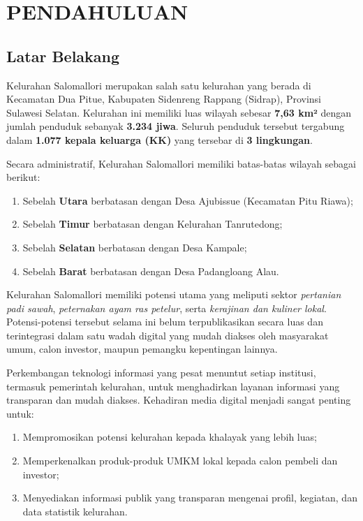 \documentclass[12pt,a4paper]{report}
\begin{document}
\tableofcontents
\clearpage

\listoffigures
\clearpage

\listoftables
\clearpage

\chapter{PENDAHULUAN}

\section{Latar Belakang}

Kelurahan Salomallori merupakan salah satu kelurahan yang berada di Kecamatan Dua Pitue, Kabupaten Sidenreng Rappang (Sidrap), Provinsi Sulawesi Selatan. Kelurahan ini memiliki luas wilayah sebesar \textbf{7,63 km²} dengan jumlah penduduk sebanyak \textbf{3.234 jiwa}. Seluruh penduduk tersebut tergabung dalam \textbf{1.077 kepala keluarga (KK)} yang tersebar di \textbf{3 lingkungan}.

Secara administratif, Kelurahan Salomallori memiliki batas-batas wilayah sebagai berikut:
\begin{enumerate}[leftmargin=2em, itemsep=2pt]
    \item Sebelah \textbf{Utara} berbatasan dengan Desa Ajubissue (Kecamatan Pitu Riawa);
    \item Sebelah \textbf{Timur} berbatasan dengan Kelurahan Tanrutedong;
    \item Sebelah \textbf{Selatan} berbatasan dengan Desa Kampale;
    \item Sebelah \textbf{Barat} berbatasan dengan Desa Padangloang Alau.
\end{enumerate}

Kelurahan Salomallori memiliki potensi utama yang meliputi sektor \emph{pertanian padi sawah}, \emph{peternakan ayam ras petelur}, serta \emph{kerajinan dan kuliner lokal}. Potensi-potensi tersebut selama ini belum terpublikasikan secara luas dan terintegrasi dalam satu wadah digital yang mudah diakses oleh masyarakat umum, calon investor, maupun pemangku kepentingan lainnya.

Perkembangan teknologi informasi yang pesat menuntut setiap institusi, termasuk pemerintah kelurahan, untuk menghadirkan layanan informasi yang transparan dan mudah diakses. Kehadiran media digital menjadi sangat penting untuk:
\begin{enumerate}[leftmargin=2em, itemsep=2pt]
    \item Mempromosikan potensi kelurahan kepada khalayak yang lebih luas;
    \item Memperkenalkan produk-produk UMKM lokal kepada calon pembeli dan investor;
    \item Menyediakan informasi publik yang transparan mengenai profil, kegiatan, dan data statistik kelurahan.
\end{enumerate}
\end{document}
